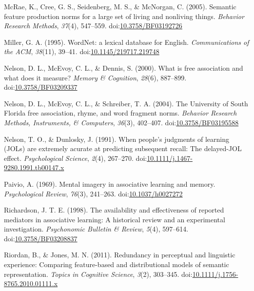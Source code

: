 \documentclass[english,,man]{apa6}
\begin{document}
\leavevmode\hypertarget{ref-McRae2005}{}%
McRae, K., Cree, G. S., Seidenberg, M. S., \& McNorgan, C. (2005). Semantic feature production norms for a large set of living and nonliving things. \emph{Behavior Research Methods}, \emph{37}(4), 547--559. doi:\href{https://doi.org/10.3758/BF03192726}{10.3758/BF03192726}

\leavevmode\hypertarget{ref-Miller1995}{}%
Miller, G. A. (1995). WordNet: a lexical database for English. \emph{Communications of the ACM}, \emph{38}(11), 39--41. doi:\href{https://doi.org/10.1145/219717.219748}{10.1145/219717.219748}

\leavevmode\hypertarget{ref-Nelson2000}{}%
Nelson, D. L., McEvoy, C. L., \& Dennis, S. (2000). What is free association and what does it measure? \emph{Memory \& Cognition}, \emph{28}(6), 887--899. doi:\href{https://doi.org/10.3758/BF03209337}{10.3758/BF03209337}

\leavevmode\hypertarget{ref-Nelson2004}{}%
Nelson, D. L., McEvoy, C. L., \& Schreiber, T. A. (2004). The University of South Florida free association, rhyme, and word fragment norms. \emph{Behavior Research Methods, Instruments, \& Computers}, \emph{36}(3), 402--407. doi:\href{https://doi.org/10.3758/BF03195588}{10.3758/BF03195588}

\leavevmode\hypertarget{ref-Nelson1991}{}%
Nelson, T. O., \& Dunlosky, J. (1991). When people's judgments of learning (JOLs) are extremely acurate at predicting subsequent recall: The delayed-JOL effect. \emph{Psychological Science}, \emph{2}(4), 267--270. doi:\href{https://doi.org/10.1111/j.1467-9280.1991.tb00147.x}{10.1111/j.1467-9280.1991.tb00147.x}

\leavevmode\hypertarget{ref-Paivio1969}{}%
Paivio, A. (1969). Mental imagery in associative learning and memory. \emph{Psychological Review}, \emph{76}(3), 241--263. doi:\href{https://doi.org/10.1037/h0027272}{10.1037/h0027272}

\leavevmode\hypertarget{ref-Richardson1998}{}%
Richardson, J. T. E. (1998). The availability and effectiveness of reported mediators in associative learning: A historical review and an experimental investigation. \emph{Psychonomic Bulletin \& Review}, \emph{5}(4), 597--614. doi:\href{https://doi.org/10.3758/BF03208837}{10.3758/BF03208837}

\leavevmode\hypertarget{ref-Riordan2011}{}%
Riordan, B., \& Jones, M. N. (2011). Redundancy in perceptual and linguistic experience: Comparing feature-based and distributional models of semantic representation. \emph{Topics in Cognitive Science}, \emph{3}(2), 303--345. doi:\href{https://doi.org/10.1111/j.1756-8765.2010.01111.x}{10.1111/j.1756-8765.2010.01111.x}
\end{document}
